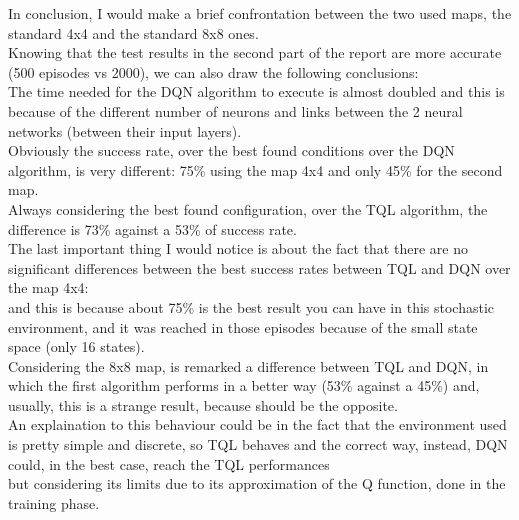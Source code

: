 \documentclass{article}
\begin{document}
In conclusion, I would make a brief confrontation between the two used maps, the standard 4x4 and the standard 8x8 ones.
\\
Knowing that the test results in the second part of the report are more accurate (500 episodes vs 2000), we can also draw the following conclusions:
\\
The time needed for the DQN algorithm to execute is almost doubled and this is because of the different number of neurons and links between the 2 neural networks (between their input layers).
\\
Obviously the success rate, over the best found conditions over the DQN algorithm, is very different: 75\% using the map 4x4 and only 45\% for the second map.
\\
Always considering the best found configuration, over the TQL algorithm, the difference is 73\% against a 53\% of success rate.
\\
The last important thing I would notice is about the fact that there are no significant differences between the best success rates between TQL and DQN over the map 4x4: 
\\
and this is because about 75\% is the best result you can have in this stochastic environment, and it was reached in those episodes because of the small state space (only 16 states).
\\
Considering the 8x8 map, is remarked a difference between TQL and DQN, in which the first algorithm performs in a better way (53\% against a 45\%) and, usually, this is a strange result, because should be the opposite.
\\
An explaination to this behaviour could be in the fact that the environment used is pretty simple and discrete, so TQL behaves and the correct way, instead, DQN could, in the best case, reach the TQL performances
\\
but considering its limits due to its approximation of the Q function, done in the training phase.
\end{document}
